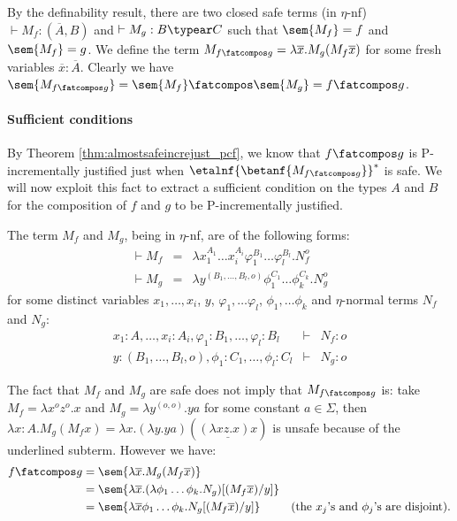 By the definability result, there are two closed safe terms (in $\eta$-nf) $\vdash M_f :(\overline{A},B)$  and $\vdash M_g :B \typear C$ such that $\sem{M_f} = f$
and $\sem{M_f} = g$.
We define the term $M_{f\fatcompos g} = \lambda \overline{x} . M_g (M_f \overline{x})$ for some fresh variables $\overline{x} : \overline{A}$. Clearly we have $\sem{M_{f\fatcompos g}} = \sem{M_f} \fatcompos \sem{M_g} = f\fatcompos g$.

\paragraph{Sufficient conditions}

By Theorem \ref{thm:almostsafeincrejust_pcf}, we know that
$f\fatcompos g$ is P-incrementally justified just when
$\etalnf{\betanf{M_{f\fatcompos g}}}^*$ is safe. We will now exploit
this fact to extract a sufficient condition on the types $A$ and $B$
for the composition of $f$ and $g$ to be P-incrementally justified.

The term $M_f$ and $M_g$, being in $\eta$-nf, are of the following forms:
\begin{eqnarray*}
\vdash M_f &=& \lambda x_1^{A_1} \ldots x_i^{A_i} \varphi_1^{B_1} \ldots \varphi_l^{B_l} . N_f^o\\
\vdash  M_g &=& \lambda y^{ (B_1, \ldots, B_l,o)} \phi_1^{C_1} \ldots \phi_k^{C_k} . N_g^o
\end{eqnarray*}
for some distinct variables $x_1, \ldots, x_i$, $y$, $\varphi_1, \dots \varphi_l$, $\phi_1, \dots \phi_k$  and $\eta$-normal terms $N_f$ and $N_g$:
\begin{eqnarray*}
x_1:A, \ldots, x_i:A_i, \varphi_1:B_1, \dots, \varphi_l:B_l &\vdash& N_f :o \\
y: (B_1, \ldots, B_l,o), \phi_1:C_1, \dots, \phi_l:C_l &\vdash& N_g :o
\end{eqnarray*}



The fact that $M_f$ and $M_g$ are safe does not imply that $M_{f\fatcompos g}$ is: take $M_f = \lambda x^o z^o.x$ and $M_g = \lambda y^{(o,o)} . y a$ for some constant $a\in \Sigma$, then $\lambda x:A . M_g (M_f x) = \lambda x . (\lambda y . y a) ( \underline{(\lambda x z.x) x} )$ is unsafe because of the underlined subterm. However we have:
\begin{align*}
f\fatcompos g &= \sem{\lambda \overline{x} . M_g (M_f  \overline{x})} \\
 &= \sem{\lambda \overline{x} . (\lambda \phi_1\ldots \phi_k . N_g) [(M_f \overline{x}) / y]} \\
&= \sem{\lambda \overline{x} \phi_1 \dots \phi_k. N_g [(M_f  \overline{x}) / y]}
& \mbox{(the $x_j$'s and $\phi_j$'s are disjoint)}.
\end{align*}

